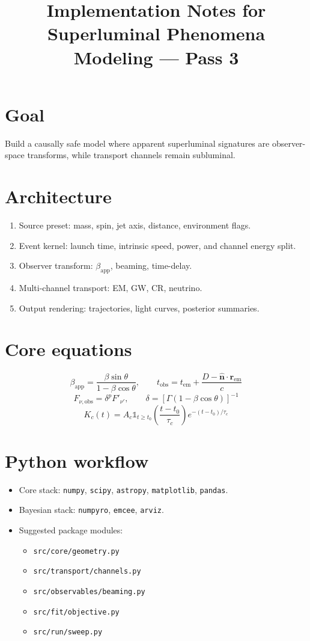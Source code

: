\documentclass[11pt]{article}
\begin{document}
\title{Implementation Notes for Superluminal Phenomena Modeling --- Pass 3}
\date{}
\maketitle

\section*{Goal}
Build a causally safe model where apparent superluminal signatures are observer-space transforms, while transport channels remain subluminal.

\section{Architecture}
\begin{enumerate}
\item Source preset: mass, spin, jet axis, distance, environment flags.
\item Event kernel: launch time, intrinsic speed, power, and channel energy split.
\item Observer transform: \(\beta_{\mathrm{app}}\), beaming, time-delay.
\item Multi-channel transport: EM, GW, CR, neutrino.
\item Output rendering: trajectories, light curves, posterior summaries.
\end{enumerate}

\section{Core equations}
\[
\beta_{\mathrm{app}}=\frac{\beta\sin\theta}{1-\beta\cos\theta},\qquad
t_{\mathrm{obs}}=t_{\mathrm{em}}+\frac{D-\mathbf{\hat n}\cdot\mathbf r_{\mathrm{em}}}{c}
\]
\[
F_{\nu,\mathrm{obs}}=\delta^{p}F'_{\nu'},\qquad
\delta=[\Gamma(1-\beta\cos\theta)]^{-1}
\]
\[
K_c(t)=A_c\mathbb{1}_{t\ge t_0}\left(\frac{t-t_0}{\tau_c}\right)e^{-(t-t_0)/\tau_c}
\]

\section{Python workflow}
\begin{itemize}
\item Core stack: \texttt{numpy}, \texttt{scipy}, \texttt{astropy}, \texttt{matplotlib}, \texttt{pandas}.
\item Bayesian stack: \texttt{numpyro}, \texttt{emcee}, \texttt{arviz}.
\item Suggested package modules:
\begin{itemize}
\item \texttt{src/core/geometry.py}
\item \texttt{src/transport/channels.py}
\item \texttt{src/observables/beaming.py}
\item \texttt{src/fit/objective.py}
\item \texttt{src/run/sweep.py}
\end{itemize}
\end{itemize}
\end{document}
